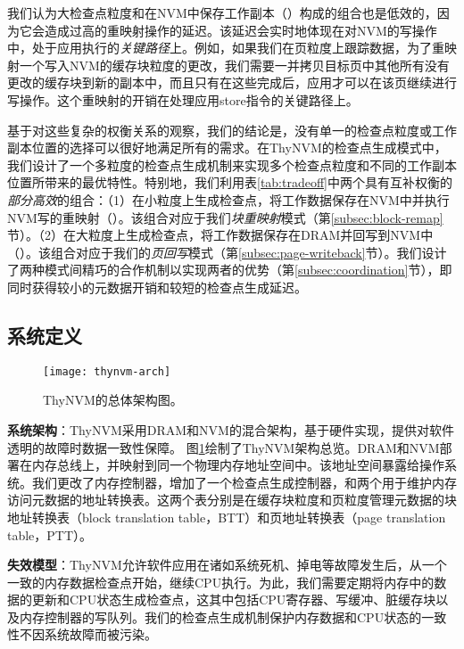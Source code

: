 我们认为大检查点粒度和在NVM中保存工作副本（）构成的组合也是低效的，因为它会造成过高的重映射操作的延迟。该延迟会实时地体现在对NVM的写操作中，处于应用执行的\emph{关键路径}上。例如，如果我们在页粒度上跟踪数据，为了重映射一个写入NVM的缓存块粒度的更改，我们需要一并拷贝目标页中其他所有没有更改的缓存块到新的副本中，而且只有在这些完成后，应用才可以在该页继续进行写操作。这个重映射的开销在处理应用store指令的关键路径上。

基于对这些复杂的权衡关系的观察，我们的结论是，没有单一的检查点粒度或工作副本位置的选择可以很好地满足所有的需求。在ThyNVM的检查点生成模式中，我们设计了一个多粒度的检查点生成机制来实现多个检查点粒度和不同的工作副本位置所带来的最优特性。特别地，我们利用表\ref{tab:tradeoff}中两个具有互补权衡的\emph{部分高效}的组合：（1）在小粒度上生成检查点，将工作数据保存在NVM中并执行NVM写的重映射（）。该组合对应于我们{\em 块重映射}模式（第\ref{subsec:block-remap}节）。（2）在大粒度上生成检查点，将工作数据保存在DRAM并回写到NVM中（）。该组合对应于我们的\emph{页回写}模式（第\ref{subsec:page-writeback}节）。我们设计了两种模式间精巧的合作机制以实现两者的优势（第\ref{subsec:coordination}节），即同时获得较小的元数据开销和较短的检查点生成延迟。

\subsection{系统定义}

\begin{figure}[!h]
\centering
\texttt{[image: thynvm-arch]}
\caption{ThyNVM的总体架构图。}
\label{fig:thynvm-arch}
\end{figure}

\textbf{系统架构}：ThyNVM采用DRAM和NVM的混合架构，基于硬件实现，提供对软件透明的故障时数据一致性保障。
图\ref{fig:thynvm-arch}绘制了ThyNVM架构总览。DRAM和NVM部署在内存总线上，并映射到同一个物理内存地址空间中。该地址空间暴露给操作系统。我们更改了内存控制器，增加了一个检查点生成控制器，和两个用于维护内存访问元数据的地址转换表。这两个表分别是在缓存块粒度和页粒度管理元数据的块地址转换表（block translation table，BTT）和页地址转换表（page translation table，PTT）。

\textbf{失效模型}：ThyNVM允许软件应用在诸如系统死机、掉电等故障发生后，从一个一致的内存数据检查点开始，继续CPU执行。为此，我们需要定期将内存中的数据的更新和CPU状态生成检查点，这其中包括CPU寄存器、写缓冲、脏缓存块以及内存控制器的写队列。我们的检查点生成机制保护内存数据和CPU状态的一致性不因系统故障而被污染。

